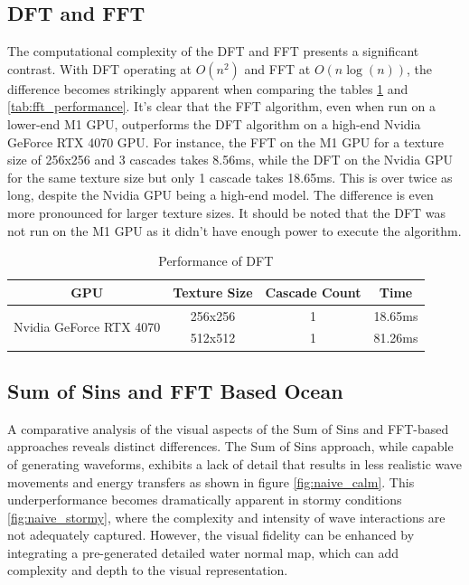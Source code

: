 \subsection{DFT and FFT}
The computational complexity of the DFT and FFT presents a significant contrast. With DFT operating at $O(n^2)$ and FFT at $O(n\log(n))$, the difference becomes strikingly apparent when comparing the tables \ref{tab:dft_ocean} and \ref{tab:fft_performance}. It's clear that the FFT algorithm, even when run on a lower-end M1 GPU, outperforms the DFT algorithm on a high-end Nvidia GeForce RTX 4070 GPU. For instance, the FFT on the M1 GPU for a texture size of 256x256 and 3 cascades takes 8.56ms, while the DFT on the Nvidia GPU for the same texture size but only 1 cascade takes 18.65ms. This is over twice as long, despite the Nvidia GPU being a high-end model. The difference is even more pronounced for larger texture sizes. It should be noted that the DFT was not run on the M1 GPU as it didn't have enough power to execute the algorithm.

\begin{table}[h]
    \centering
    \begin{tabular}{cccc}
        \toprule
        \textbf{GPU} & \textbf{Texture Size} & \textbf{Cascade Count} & \textbf{Time} \\
        \midrule
        \multirow{2}{*}{Nvidia GeForce RTX 4070} & 256x256 & 1 & 18.65ms \\
                                                  & 512x512 & 1 & 81.26ms \\
        \bottomrule
    \end{tabular}
    \caption{Performance of DFT}
    \label{tab:dft_ocean}
\end{table}

\subsection{Sum of Sins and FFT Based Ocean}
A comparative analysis of the visual aspects of the Sum of Sins and FFT-based approaches reveals distinct differences. The Sum of Sins approach, while capable of generating waveforms, exhibits a lack of detail that results in less realistic wave movements and energy transfers as shown in figure \ref{fig:naive_calm}. This underperformance becomes dramatically apparent in stormy conditions \ref{fig:naive_stormy}, where the complexity and intensity of wave interactions are not adequately captured. However, the visual fidelity can be enhanced by integrating a pre-generated detailed water normal map, which can add complexity and depth to the visual representation.

